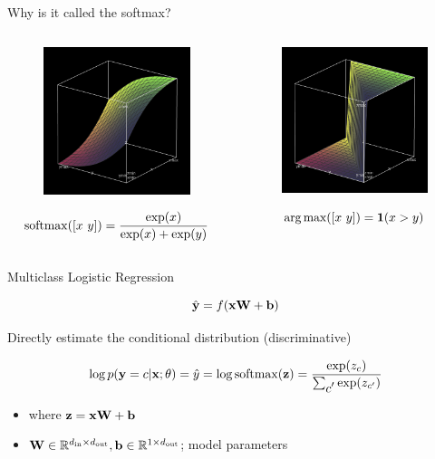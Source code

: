 \documentclass{beamer}
\begin{document}
\begin{frame}{Why is it called the softmax?}

  \begin{columns}[t]
    \begin{column}[t]{0.5\textwidth}


      \begin{figure}
        \centering
        \includegraphics[width=5cm]{softmax}
      \end{figure}
      \[\softmax([x\ y]) = \frac{\exp(x)}{\displaystyle  \exp(x) + \exp(y)}  \]
    \end{column}

    \begin{column}[t]{0.5\textwidth}


      \begin{figure}
        \centering
      \includegraphics[width=5cm]{argmax}
      \end{figure}
      \[\argmax([x\ y]) = \indicator(x > y) \]      
    \end{column}
  \end{columns}
\end{frame}

\begin{frame}{Multiclass Logistic Regression}

  
  
  \[ \hat{\mathbf{y}} = f(\mathbf{x} \mathbf{W} + \mathbf{b}) \]

  Directly estimate the conditional distribution (discriminative)

    \[ \log p(\boldy =c | \boldx; \theta) = \hat{y} = \log \softmax(\boldz) = 
      \frac{\exp(z_c)}{ \sum_{\displaystyle c'} \exp(z_{c'})}   \] 
    \begin{itemize}
    \item  where  $\mathbf{z} = \mathbf{x} \mathbf{W} + \mathbf{b}$
    \item $\mathbf{W} \in \mathbb{R}^{{d_{\mathrm{in}}} \times {d_{\mathrm{out}}}}, \mathbf{b} \in \mathbb{R}^{1 \times {d_{\mathrm{out}}}}$; model parameters
    \end{itemize}

\end{frame}
\end{document}

